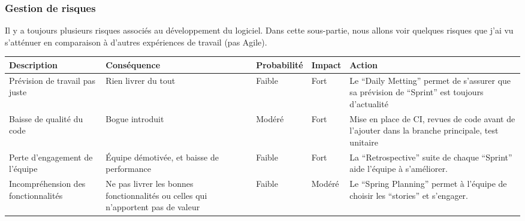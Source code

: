 \subsubsection{Gestion de risques}
Il y a toujours plusieurs risques associés au développement du logiciel. Dans cette sous-partie, nous allons voir quelques risques que j'ai vu s'atténuer en comparaison à d'autres expériences de travail (pas Agile). \cite{basile_plessis_2014}
\begin{center}
\begin{tabular}{p{3cm}|p{3cm}|l|l|p{5cm}}
Description & Conséquence & Probabilité & Impact & Action \\ \hline
Prévision de travail pas juste & Rien livrer du tout & Faible & Fort & Le \enquote{Daily Metting} permet de s'assurer que sa prévision de \enquote{Sprint} est toujours d'actualité \\
Baisse de qualité du code & Bogue introduit & Modéré & Fort & Mise en place de CI, revues de code avant de l'ajouter dans la branche principale, test unitaire \\
Perte d'engagement de l'équipe & Équipe démotivée, et baisse de performance & Faible & Fort & La \enquote{Retrospective} suite de chaque \enquote{Sprint} aide l'équipe à s'améliorer. \\
Incompréhension des fonctionnalités & Ne pas livrer les bonnes fonctionnalités ou celles qui n'apportent pas de valeur & Faible & Modéré & Le \enquote{Spring Planning} permet à l'équipe de choisir les \enquote{stories} et s'engager. \\


\end{tabular}
\end{center}
